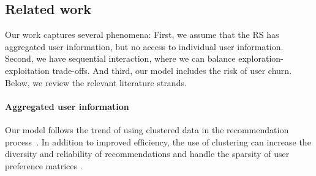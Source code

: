 

\subsection{Related work}
Our work captures several phenomena: First, we assume that the RS has aggregated user information, but no access to individual user information. Second, we have sequential interaction, where we can balance exploration-exploitation trade-offs. And third, our model includes the risk of user churn. Below, we review the relevant literature strands.

\paragraph{Aggregated user information}
Our model follows the trend of using clustered data in the recommendation process~\cite{recommender-systems-for-large-scale-e-commerce-scalable-neighborhood-formation-using-clustering}. In addition to improved efficiency, the use of clustering can increase the diversity and reliability of recommendations \cite{a-clustering-approach-for-personalizing-diversity-in-collaborative-recommender-systems, robust-collaborative-filtering-based-on-multiple-clustering} and handle the sparsity of user preference matrices \cite{recommender-systems-clustering-using-bayesian-non-negative-matrix-factorization}.

